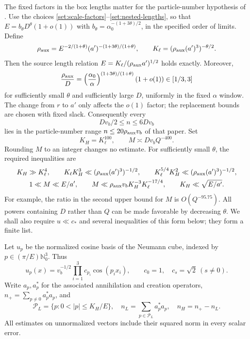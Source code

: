 The fixed factors in the box lengths matter for the particle-number
hypothesis of \cite{FJGMOT}.  Use the choices
\eqref{set:scale-factors}--\eqref{set:nested-lengths}, so that
$E=b_\theta D^\theta(1+o(1))$ with
$b_\theta=\alpha_0^{-(1+3\theta)/2}$, in the specified order of limits.
Define
\[
 \rho_{\rm aux}
   =E^{-2/(1+\theta)}(a')^{-(1+3\theta)/(1+\theta)},\qquad
 K_\ell=(\rho_{\rm aux}(a')^3)^{-\theta/2}.
\]
Then the source length relation
$E=K_\ell/(\rho_{\rm aux}a')^{1/2}$ holds exactly.  Moreover,
\[
 \frac{\rho_{\rm aux}}D
 =\left(\frac{\alpha_0}{\alpha}\right)^{(1+3\theta)/(1+\theta)}
          (1+o(1))\in[1/3,3]
\]
for sufficiently small $\theta$ and sufficiently large $D$, uniformly
in the fixed $\alpha$ window.  The change from $r$ to $a'$ only affects
the $o(1)$ factor; the replacement bounds are chosen with fixed slack.
Consequently every
\begin{equation}\label{en:middle-sector}
 Dv_b/2\le n\le6Dv_b
\end{equation}
lies in the particle-number range $n\le20\rho_{\rm aux}v_b$ of that
paper.  Set
\begin{equation}\label{en:parameters}
 K_H=K_\ell^{100},\qquad
 M\asymp Dv_bQ^{-400}.
\end{equation}
Rounding $M$ to an integer changes no estimate.  For sufficiently small
$\theta$, the required inequalities are
\begin{gather}
 K_H\gg K_\ell^4,\qquad
 K_\ell K_H^3\ll(\rho_{\rm aux}(a')^3)^{-1/2},\qquad
 K_\ell^{5/4}K_H^2\ll(\rho_{\rm aux}(a')^3)^{-1/2},\label{en:parameter-conditions}\\
 1\ll M\ll E/a',\qquad
 M\ll \rho_{\rm aux}v_bK_H^{-3}K_\ell^{-17/4},\qquad
 K_H\ll\sqrt{E/a'}.\nonumber
\end{gather}
For example, the ratio in the second upper bound for $M$ is
$O(Q^{-95.75})$.  All powers containing $D$ rather than $Q$ can be made
favorable by decreasing $\theta$.  We shall also require
$u\ll c_*$ and several inequalities of this form below; they form a
finite list.

Let $u_p$ be the normalized cosine basis of the Neumann cube, indexed by
$p\in(\pi/E)\mathbb N_0^3$.  Thus
\[
 u_p(x)=v_b^{-1/2}\prod_{i=1}^3 c_{p_i}\cos(p_ix_i),\qquad
 c_0=1,\quad c_s=\sqrt2\ (s\ne0).
\]
Write $a_p,a_p^*$ for the associated annihilation and creation operators,
$n_+=\sum_{p\ne0}a_p^*a_p$, and
\begin{equation}\label{en:bands}
 \mathcal P_L=\{p:0<|p|\le K_H/E\},\quad
 n_L=\sum_{p\in\mathcal P_L}a_p^*a_p,\quad n_H=n_+-n_L.
\end{equation}
All estimates on unnormalized vectors include their squared norm in
every scalar error.

